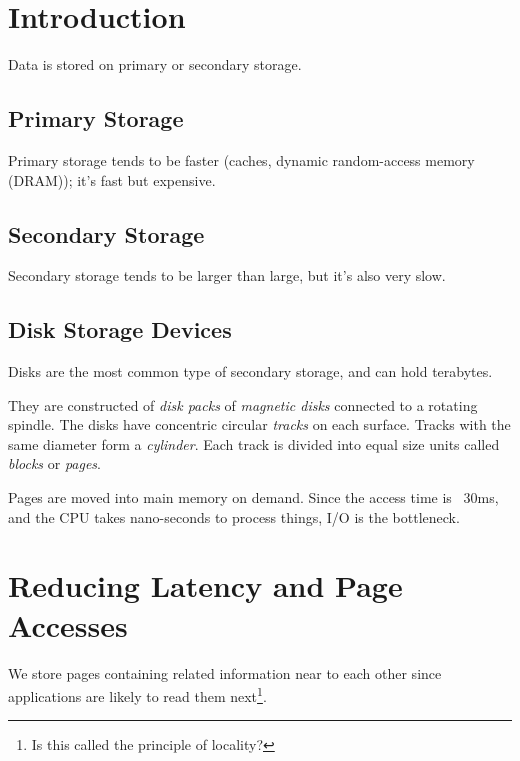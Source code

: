             \section{Introduction} %
            \label{sec:introduction}
                Data is stored on primary or secondary storage.
                \subsection{Primary Storage} %
                \label{sub:primary_storage}
                    Primary storage tends to be faster (caches, dynamic random-access memory (DRAM)); it's fast but expensive.
                \subsection{Secondary Storage} %
                \label{sub:secondary_storage}
                    Secondary storage tends to be larger than large, but it's also very slow.
                \subsection{Disk Storage Devices} %
                \label{sub:disk_storage_devices}
                    Disks are the most common type of secondary storage, and can hold terabytes.

                    They are constructed of \textit{disk packs} of \textit{magnetic disks} connected to a rotating spindle.
                    The disks have concentric circular \textit{tracks} on each surface.
                    Tracks with the same diameter form a \textit{cylinder}.
                    Each track is divided into equal size units called \textit{blocks} or \textit{pages}. 

                    Pages are moved into main memory on demand.
                    Since the access time is ~$30$ms, and the CPU takes nano-seconds to process things, I/O is the bottleneck.
            \section{Reducing Latency and Page Accesses} %
            \label{sec:reducing_latency_and_page_accesses}
                We store pages containing related information near to each other since applications are likely to read them next\footnote{Is this called the principle of locality?}.
